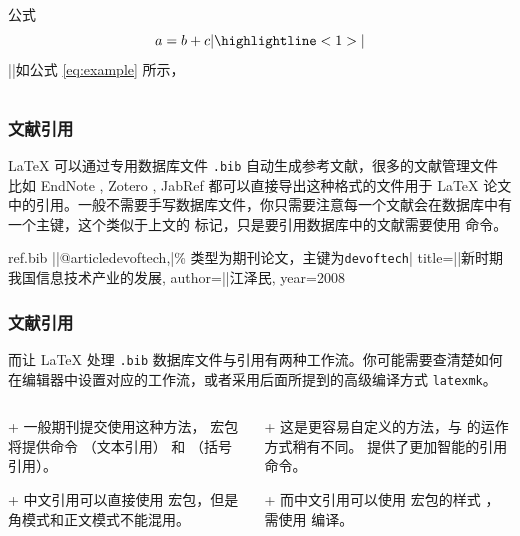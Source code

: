 \begin{shadedsection}
\begin{frame}[fragile]
\begin{columns}
\begin{column}{0.5\textwidth}
\begin{codeblock}[]{公式}
\begin{equation}
  a = b + c
|\highlightline<1>|\label{eq:example}
\end{equation}
||如公式 \eqref{eq:example} 所示，
\end{codeblock}
    \end{column}
  \end{columns}
\end{frame}

\begin{frame}[fragile]
  \frametitle{文献引用}
  \LaTeX{} 可以通过专用数据库文件 \texttt{.bib} 自动生成参考文献，很多的文献管理文件比如 EndNote , Zotero , JabRef  都可以直接导出这种格式的文件用于 \LaTeX{} 论文中的引用。一般不需要手写数据库文件，你只需要注意每一个文献会在数据库中有一个主键，这个类似于上文的  标记，只是要引用数据库中的文献需要使用  命令。
  
  \begin{codeblock}[]{ref.bib}
|\highlightline|@article{devoftech,|\hfill\alert{\% 类型为期刊论文，主键为\texttt{devoftech}}|
  title={||新时期我国信息技术产业的发展},
  author={||江泽民},
  year={2008}
}
  \end{codeblock}
\end{frame}

\begin{frame}
  \frametitle{文献引用}
  而让 \LaTeX{} 处理 \texttt{.bib} 数据库文件与引用有两种工作流。你可能需要查清楚如何在编辑器中设置对应的工作流，或者采用后面所提到的高级编译方式 \texttt{latexmk}。
  \begin{columns}
    \begin{column}{0.5\textwidth}
      \begin{block}{ + }
        一般期刊提交使用这种方法， 宏包将提供命令 （文本引用） 和 （括号引用）。
      \end{block}
      \begin{alertblock}{ + }
        中文引用可以直接使用  宏包，但是角模式和正文模式不能混用。
      \end{alertblock}
    \end{column}
    \begin{column}{0.5\textwidth}
      \begin{block}{ + }
        这是更容易自定义的方法，与  的运作方式稍有不同。 提供了更加智能的引用命令。
      \end{block}
      \begin{alertblock}{ + }
        而中文引用可以使用  宏包的样式 ，需使用  编译。
      \end{alertblock}
    \end{column}
  \end{columns}
\end{frame}


\end{shadedsection}

